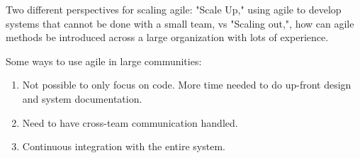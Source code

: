 \documentclass{article}
\begin{document}
Two different perspectives for scaling agile: "Scale Up," using agile to develop systems that cannot be done with a small team, vs "Scaling out,", how can agile methods be introduced across a large organization with lots of experience.

Some ways to use agile in large communities:
\begin{enumerate}
    \item Not possible to only focus on code.  More time needed to do up-front design and system documentation.
    \item Need to have cross-team communication handled.
    \item Continuous integration with the entire system.
\end{enumerate}
\end{document}
